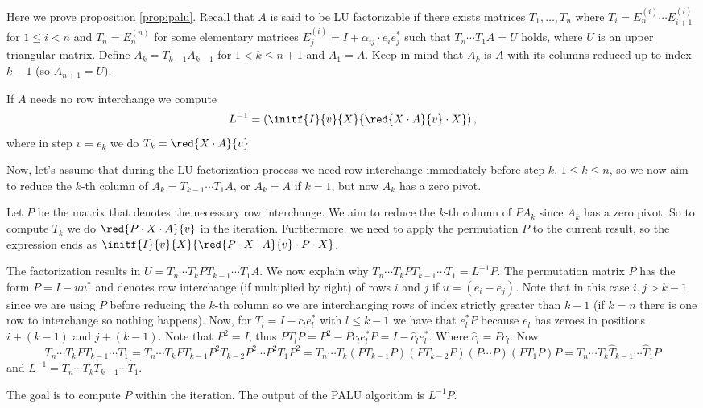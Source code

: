 Here we prove proposition  \ref{prop:palu}. Recall that $A$ is said to be LU factorizable if there exists matrices $T_1,\ldots, T_{n}$ where $T_i=E_{n}^{(i)}\cdots E_{i+1}^{(i)}$ for $1\leq i < n$ and $T_n=E^{(n)}_n$ for some elementary matrices $E_{j}^{(i)}=I+\alpha_{ij}\cdot e_{i}e_{j}^{*}$ such that $T_{n}\cdots T_1A=U$ holds, where $U$ is an upper triangular matrix. Define $A_k=T_{k-1}A_{k-1}$ for $1< k\leq n+1$ and $A_1=A$. Keep in mind that $A_k$ is $A$ with its columns reduced up to index $k-1$ (so $A_{n+1}=U$). 

If $A$ needs no row interchange we compute $$L^{-1}=\left( \initf{I}{v}{X}{\red{X\cdot A}{v}\cdot X} \right),$$ where in step $v=e_k$ we do $T_k=\red{X\cdot A}{v}$ 


Now, let's assume that during the LU factorization process we need row interchange immediately before step $k$, $1\leq k\leq n$, so we now aim to reduce the $k$-th column of $A_k=T_{k-1}\cdots T_1A$, or $A_k=A$ if $k=1$, but now $A_k$ has a zero pivot. 

Let $P$ be the matrix that denotes the necessary row interchange. We aim to reduce the $k$-th column of $PA_{k}$ since $A_{k}$ has a zero pivot. So to compute $T_k$ we do $\red{P\cdot X\cdot A}{v}$ in the iteration. Furthermore, we need to apply the permutation $P$ to the current result, so the expression ends as $\initf{I}{v}{X}{\red{P\cdot X\cdot A}{v}\cdot P\cdot X}$.

The factorization results in $U=T_{n}\cdots T_kPT_{k-1}\cdots T_1A$. We now explain why $T_{n}\cdots T_kPT_{k-1}\cdots T_1 = L^{-1}P.$ The permutation matrix $P$ has the form $P = I - uu^*$ and denotes row interchange (if multiplied by right) of rows $i$ and $j$ if $u=(e_{i}-e_{j})$. Note that in this case $i,j>k-1$ since we are using $P$ before reducing the $k$-th column so we are interchanging rows of index strictly greater than $k-1$ (if $k=n$ there is one row to interchange so nothing happens). Now, for $T_{l}=I-c_le_l^*$ with $l\leq k-1$ we have that $e_l^*P$ because $e_l$ has zeroes in positions $i+(k-1)$ and $j+(k-1)$. Note that $P^2=I$, thus $PT_lP=P^2-Pc_le_l^*P=I-\widehat{c}_le_l^*.$ Where $\widehat{c}_l=Pc_l$. Now $$T_{n}\cdots T_kPT_{k-1}\cdots T_1=T_{n}\cdots T_kPT_{k-1}P^2T_{k-2}P^2\cdots P^2 T_1P^2=T_{n}\cdots T_k(PT_{k-1}P)(PT_{k-2}P)(P\cdots P)(PT_1P)P=T_{n}\cdots T_k\widehat{T}_{k-1}\cdots \widehat{T}_1P$$ and $L^{-1} = T_{n}\cdots T_k\widehat{T}_{k-1}\cdots \widehat{T}_1$.

The goal is to compute $P$ within the iteration. The output of the PALU algorithm is $L^{-1}P$.

